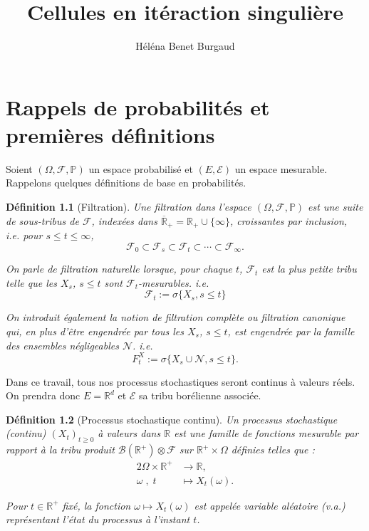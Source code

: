 \documentclass[openany]{book}
\title{Cellules en itéraction singulière}
\author{Héléna Benet Burgaud}
\newcommand{\F}{\mathscr{F}}
\newcommand{\N}{\mathscr{N}}
\newcommand{\carE}{\mathscr{E}}
\renewcommand{\P}{\mathds{P}}
\newcommand{\R}{\mathbb{R}}
\newcommand{\1}{\mathbbm{1}}
\theoremstyle{thmfont}
\theoremstyle{deffont}
\newtheorem{definition}[definition]{Définition}
\theoremstyle{thmfont}
\theoremstyle{deffont}
\begin{document}

\tableofcontents
\clearpage
{} %
\setcounter{page}{1}
\let\cleardoublepage\relax

\chapter{Rappels de probabilités et premières définitions}

Soient $(\Omega, \F, \P )$ un espace probabilisé et $(E, \carE)$ un espace mesurable. Rappelons quelques définitions de base en probabilités.

\begin{definition}[Filtration] Une \textit{filtration} dans l'espace $(\Omega, \F, \P )$ est une suite de sous-tribus de $\F$, indexées dans $\overline{\R}_+ = \R_+ \cup \{\infty\}$, croissantes par inclusion, \\
i.e. pour $s \leq t \leq \infty$,
$$\F_0 \subset \F_s \subset \F_t\subset \cdots \subset \F_\infty .$$

On parle de \textit{filtration naturelle} lorsque, pour chaque $t$, $\F_t$ est la plus petite tribu telle que les $X_s$, $s\leq t$ sont $\F_t$-mesurables. i.e.
$$\F_t := \sigma\{X_s, s\leq t\}$$

On introduit également la notion de \textit{filtration complète} ou
\textit{filtration canonique} qui, en plus d'être engendrée par tous les $X_s$, $s \leq t$, est engendrée par la famille des ensembles négligeables $\N$. i.e.
$$F^X_t := \sigma\{X_s\cup \N, s\leq t\}.$$

\label{def:filtration}
\end{definition}
Dans ce travail, tous nos processus stochastiques seront continus à valeurs réels. On prendra donc $E = \R^d$ et $\carE$ sa tribu borélienne associée.

\begin{definition}[Processus stochastique continu]
  Un \textit{processus stochastique (continu)} $(X_t)_{t \ge 0}$ à valeurs dans $\mathbb{R}$ est une famille de fonctions mesurable par rapport à la tribu produit $\mathcal{B}(\mathbb{R}^+) \otimes \mathcal{F}$ sur $\mathbb{R}^+ \times \Omega$ définies telles que :
  \begin{alignat*}{2}
    \Omega\times \R^+ &\rightarrow \R, \\
    \omega\;,\; t\quad &\mapsto X_t(\omega).
  \end{alignat*}
  
  Pour $t \in \mathbb{R}^+$ fixé, la fonction $\omega \mapsto X_t(\omega)$ est appelée \textit{variable aléatoire} (v.a.) représentant l’état du processus à l’instant $t$.
\end{definition}
\end{document}
